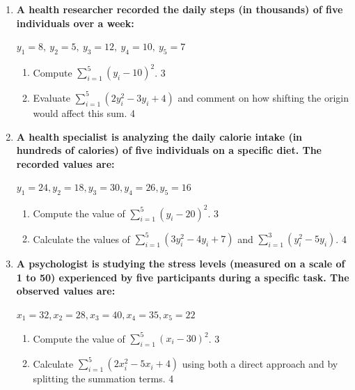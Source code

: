 \documentclass[a4paper,oneside]{book}
\begin{document}
\begin{enumerate}
	  \begin{center}  
	  $x_1=15, x_2=-12, x_3=10, x_4=21, x_5=33$  
	  \end{center} 
  \begin{enumerate}
    \item
	What is sample? \hfill 1
    \item
	Briefly explain shift of origin and scale. \hfill 2
    \item  
	Compute the value of $\displaystyle \sum_{i=1}^5 (x_i-20)^2$ \hfill 3
    \item
	Find the value of $\displaystyle \sum_{i=1}^5 (3x_i^2-2x_i-3)$ and examine its dependency on origin and scale. \hfill 4
  \end{enumerate} 
  
  \item
\textbf{A health researcher recorded the daily steps (in thousands) of five individuals over a week:}

\begin{center}
$y_1 = 8,\ y_2 = 5,\ y_3 = 12,\ y_4 = 10,\ y_5 = 7$
\end{center}

\begin{enumerate}
    \item
    Compute $\displaystyle \sum_{i=1}^5 (y_i - 10)^2$. \hfill 3
    
    \item
    Evaluate $\displaystyle \sum_{i=1}^5 (2y_i^2 - 3y_i + 4)$ and comment on how shifting the origin would affect this sum. \hfill 4
\end{enumerate}

\item
\textbf{A health specialist is analyzing the daily calorie intake (in hundreds of calories) of five individuals on a specific diet. The recorded values are:}
\begin{center}
$y_1 = 24, y_2 = 18, y_3 = 30, y_4 = 26, y_5 = 16$
\end{center}
\begin{enumerate}
\item
Compute the value of $\displaystyle \sum_{i=1}^5 (y_i - 20)^2$. \hfill 3
\item
Calculate the values of $\displaystyle \sum_{i=1}^5 (3y_i^2 - 4y_i + 7)$ and $\displaystyle \sum_{i=1}^3 (y_i^2 - 5y_i)$. \hfill 4
\end{enumerate}
  
  \item
\textbf{A psychologist is studying the stress levels (measured on a scale 
of 1 to 50) experienced by five participants during a specific task. 
The observed values are:}
\begin{center}
$x_1 = 32, x_2 = 28, x_3 = 40, x_4 = 35, x_5 = 22$
\end{center}
\begin{enumerate}
    \item
    Compute the value of $\displaystyle \sum_{i=1}^5 (x_i - 30)^2$. \hfill 3
    \item
    Calculate $\displaystyle \sum_{i=1}^5 (2x_i^2 - 5x_i + 4)$ using both a direct approach and by splitting the summation terms. \hfill 4
\end{enumerate}



\end{enumerate}
\end{document}
